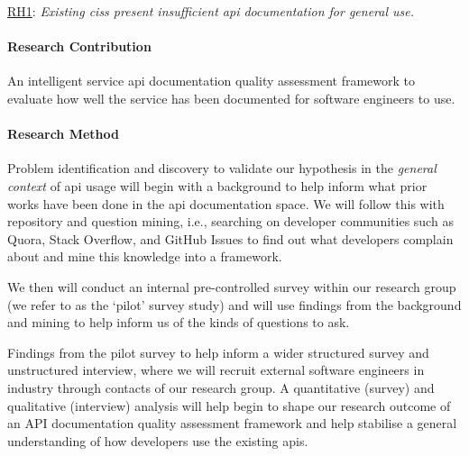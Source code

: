 \begin{titled-frame}{\underline{RH1}: \textit{Existing \glspl{cis} present insufficient \gls{api} documentation for general use.} }
\paragraph{Research Contribution} An intelligent service \gls{api} documentation quality assessment framework to evaluate how well the service has been documented for software engineers to use.

\paragraph{Research Method}

Problem identification and discovery to validate our hypothesis in the \textit{general context} of \gls{api} usage will begin with a background to help inform what prior works have been done in the \gls{api} documentation space. We will follow this with repository and question mining, i.e., searching on developer communities such as Quora, Stack Overflow, and GitHub Issues to find out what developers complain about and mine this knowledge into a framework.

We then will conduct an internal pre-controlled survey within our research group (we refer to as the `pilot' survey study) and will use findings from the background and mining to help inform us of the kinds of questions to ask. 

Findings from the pilot survey to help inform a wider structured survey and unstructured interview, where we will recruit external software engineers in industry through contacts of our research group. A quantitative (survey) and qualitative (interview) analysis will help begin to shape our research outcome of an API documentation quality assessment framework and help stabilise a general understanding of how developers use the existing \glspl{api}.
\end{titled-frame}

